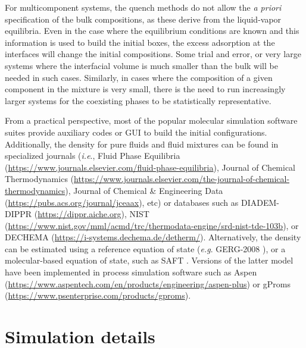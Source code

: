 \documentclass[9pt,tutorial]{livecoms}
\begin{document}
For multicomponent systems, the quench methods do not allow the \textit{a
priori} specification of the bulk compositions, as these derive from the
liquid-vapor equilibria. Even in the case where the equilibrium conditions are
known and this information is used to build the initial boxes, the excess
adsorption at the interfaces will change the initial compositions. Some trial
and error, or very large systems where the interfacial volume is much smaller
than the bulk will be needed in such cases. Similarly, in cases where the
composition of a given component in the mixture is very small, there is the
need to run increasingly larger systems for the coexisting phases to be
statistically representative.

From a practical perspective, most of the popular molecular simulation software
suites provide auxiliary codes or GUI to build the initial configurations.
Additionally, the density for pure fluids and fluid mixtures can be found in
specialized journals (\textit{i.e}., Fluid Phase Equilibria (\url{https://www.journals.elsevier.com/fluid-phase-equilibria}),
Journal of Chemical Thermodynamics (\url{https://www.journals.elsevier.com/the-journal-of-chemical-thermodynamics}),
Journal of Chemical \& Engineering Data (\url{https://pubs.acs.org/journal/jceaax}),
etc)
or databases such as DIADEM-DIPPR (\url{https://dippr.aiche.org}),
NIST \citep{lemmon2013} (\url{https://www.nist.gov/mml/acmd/trc/thermodata-engine/srd-nist-tde-103b}),
or DECHEMA (\url{https://i-systems.dechema.de/detherm/}).
Alternatively, the density can be estimated using a reference equation of state
(\textit{e.g}. GERG-2008 \citep{kunz2012}),
or a molecular-based equation of
state, such as SAFT \citep{lafitte2013}.
Versions of the latter model have been implemented in process simulation
software such as Aspen (\url{https://www.aspentech.com/en/products/engineering/aspen-plus})
or gProms (\url{https://www.psenterprise.com/products/gproms}).

\section{Simulation details}
\label{sec:simdetails}
\end{document}
